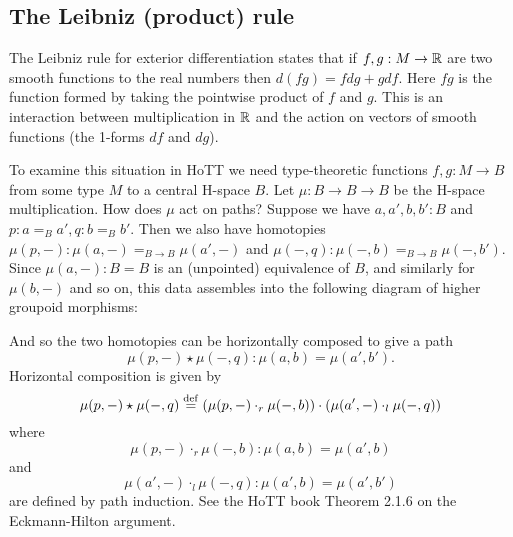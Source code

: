 \subsection{The Leibniz (product) rule}

The Leibniz rule for exterior differentiation states that if \( f, g:M\to \mathbb{R} \) are two smooth functions to the real numbers then \( d(fg) = fdg + gdf \). Here \( fg \) is the function formed by taking the pointwise product of \( f \) and \( g \). This is an interaction between multiplication in \( \mathbb{R} \) and the action on vectors of smooth functions (the 1-forms \( df \) and \( dg \)). 

To examine this situation in HoTT we need type-theoretic functions \( f, g:M\to B \) from some type \( M \) to a central H-space \( B \). Let \( \mu:B\to B\to B \) be the H-space multiplication. How does \( \mu \) act on paths? Suppose we have \( a, a', b, b':B \) and \( p:a=_B a', q:b=_B b' \). Then we also have homotopies \( \mu(p, -):\mu(a, -)=_{B\to B}\mu(a', -) \) and \( \mu(-,q):\mu(-,b)=_{B\to B}\mu(-,b'). \) Since \( \mu(a, -):B=B \) is an (unpointed) equivalence of \( B \), and similarly for \( \mu(b, -) \) and so on, this data assembles into the following diagram of higher groupoid morphisms:

\begin{center}
\end{center}

And so the two homotopies can be horizontally composed to give a path \[ \mu(p,-)\star\mu(-,q): \mu(a, b)=\mu(a',b'). \] Horizontal composition is given by \[\mu(p,-)\star\mu(-,q)\stackrel{\mathrm{def}}{=}(\mu(p,-)\cdot_r \mu(-,b))\cdot(\mu(a', -)\cdot_l\mu(-, q))\] where \[ \mu(p,-)\cdot_r\mu(-,b):\mu(a,b)=\mu(a',b) \] and \[ \mu(a',-)\cdot_l\mu(-,q):\mu(a',b)=\mu(a',b') \] are defined by path induction.  See the HoTT book Theorem 2.1.6 on the Eckmann-Hilton argument\cite{hottbook}.

